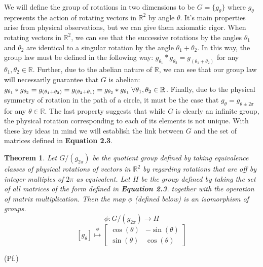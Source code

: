 \documentclass[10pt]{ucthesis}
\newcommand{\R}{\mathbb{R}}
\newtheorem{theorem}[definition]{Theorem}
\begin{document}
We will define the group of rotations in two dimensions to be $G = \{g_\theta\}$ where $g_\theta$ represents the action of rotating vectors in $\R^2$ by angle $\theta$. It's main properties arise from physical observations, but we can give them axiomatic rigor. When rotating vectors in $\R^2$, we can see that the successive rotations by the angles $\theta_1$ and $\theta_2$ are identical to a singular rotation by the angle $\theta_1+\theta_2$. In this way, the group law must be defined in the following way: $g_{\theta_1} * g_{\theta_2} = g_{(\theta_1 + \theta_2)}$ for any $\theta_1,\theta_2\in\R$. Further, due to the abelian nature of $\R$, we can see that our group law will necessarily guarantee that $G$ is abelian:  $g_{\theta_1} * g_{\theta_2} = g_{(\theta_1 + \theta_2)}= g_{(\theta_2 + \theta_1)}= g_{\theta_2} * g_{\theta_1} \hspace{1mm}\forall \theta_1,\theta_2\in\R$. Finally, due to the physical symmetry of rotation in the path of a circle, it must be the case that $g_\theta = g_{\theta \pm 2\pi}$ for any $\theta \in \R$. The last property suggests that while $G$ is clearly an infinite group, the physical rotation corresponding to each of its elements is not unique. With these key ideas in mind we will establish the link between $G$ and the set of matrices defined in \textbf{Equation 2.3}.

\begin{theorem}
	Let $G/(g_{2\pi})$ be the quotient group defined by taking equivalence classes of physical rotations of vectors in $\R^2$ by regarding rotations that are off by integer multiples of $2\pi$ as equivalent. Let $H$ be the group defined by taking the set of all matrices of the form defined in \textbf{Equation 2.3}. together with the operation of matrix multiplication. Then the map $\phi$ (defined below) is an isomorphism of groups.
$$\phi:G/(g_{2\pi})\rightarrow H$$
$$[g_\theta] \overset{\phi}{\mapsto} \begin{bmatrix}
			\cos(\theta) & -\sin(\theta) \\
			\sin(\theta) & \cos(\theta)
		\end{bmatrix}$$
\end{theorem}
\noindent(Pf.) 
\end{document}
